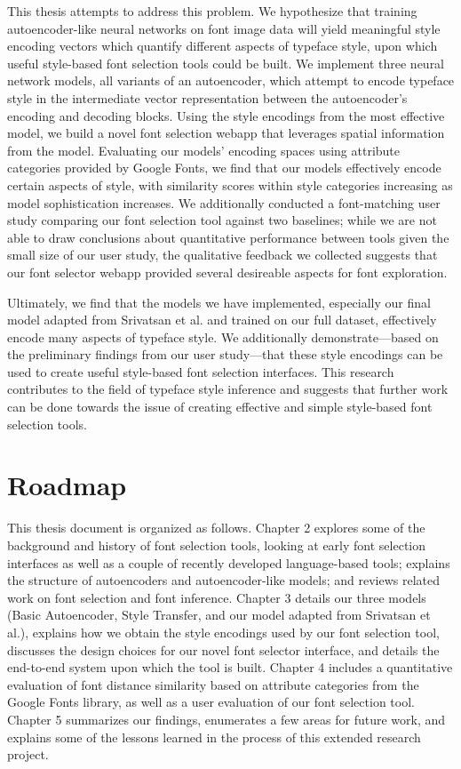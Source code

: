 This thesis attempts to address this problem. We hypothesize that training autoencoder-like neural networks on font image data will yield meaningful style encoding vectors which quantify different aspects of typeface style, upon which useful style-based font selection tools could be built. We implement three neural network models, all variants of an autoencoder, which attempt to encode typeface style in the intermediate vector representation between the autoencoder's encoding and decoding blocks. Using the style encodings from the most effective model, we build a novel font selection webapp that leverages spatial information from the model. Evaluating our models' encoding spaces using attribute categories provided by Google Fonts, we find that our models effectively encode certain aspects of style, with similarity scores within style categories increasing as model sophistication increases. We additionally conducted a font-matching user study comparing our font selection tool against two baselines; while we are not able to draw conclusions about quantitative performance between tools given the small size of our user study, the qualitative feedback we collected suggests that our font selector webapp provided several desireable aspects for font exploration.

Ultimately, we find that the models we have implemented, especially our final model adapted from Srivatsan et al. \cite{srivatsan2020} and trained on our full dataset, effectively encode many aspects of typeface style. We additionally demonstrate---based on the preliminary findings from our user study---that these style encodings can be used to create useful style-based font selection interfaces. This research contributes to the field of typeface style inference and suggests that further work can be done towards the issue of creating effective and simple style-based font selection tools.

\section{Roadmap}

This thesis document is organized as follows. Chapter 2 explores some of the background and history of font selection tools, looking at early font selection interfaces as well as a couple of recently developed language-based tools; explains the structure of autoencoders and autoencoder-like models; and reviews related work on font selection and font inference. Chapter 3 details our three models (Basic Autoencoder, Style Transfer, and our model adapted from Srivatsan et al.), explains how we obtain the style encodings used by our font selection tool, discusses the design choices for our novel font selector interface, and details the end-to-end system upon which the tool is built. Chapter 4 includes a quantitative evaluation of font distance similarity based on attribute categories from the Google Fonts library, as well as a user evaluation of our font selection tool. Chapter 5 summarizes our findings, enumerates a few areas for future work, and explains some of the lessons learned in the process of this extended research project.